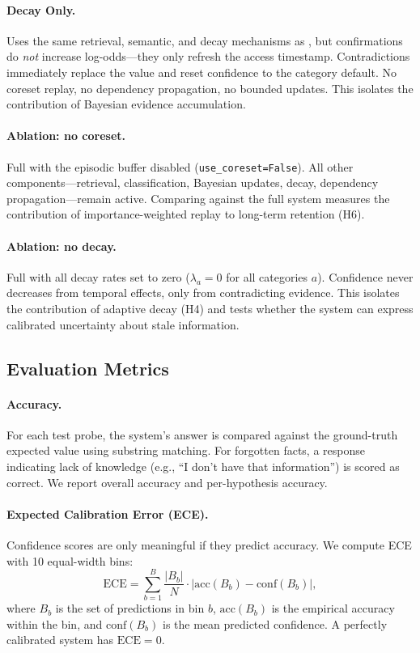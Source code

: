 \paragraph{Decay Only.}
Uses the same retrieval, semantic, and decay mechanisms as \membayes{}, but confirmations do \emph{not} increase log-odds---they only refresh the access timestamp. Contradictions immediately replace the value and reset confidence to the category default. No coreset replay, no dependency propagation, no bounded updates. This isolates the contribution of Bayesian evidence accumulation.

\paragraph{Ablation: no coreset.}
Full \membayes{} with the episodic buffer disabled (\texttt{use\_coreset=False}). All other components---retrieval, classification, Bayesian updates, decay, dependency propagation---remain active. Comparing against the full system measures the contribution of importance-weighted replay to long-term retention (H6).

\paragraph{Ablation: no decay.}
Full \membayes{} with all decay rates set to zero ($\lambda_a = 0$ for all categories $a$). Confidence never decreases from temporal effects, only from contradicting evidence. This isolates the contribution of adaptive decay (H4) and tests whether the system can express calibrated uncertainty about stale information.


\subsection{Evaluation Metrics}
\label{sec:metrics}

\paragraph{Accuracy.}
For each test probe, the system's answer is compared against the ground-truth expected value using substring matching. For forgotten facts, a response indicating lack of knowledge (e.g., ``I don't have that information'') is scored as correct. We report overall accuracy and per-hypothesis accuracy.

\paragraph{Expected Calibration Error (ECE).}
Confidence scores are only meaningful if they predict accuracy. We compute ECE with 10 equal-width bins:
\begin{equation}
  \mathrm{ECE} = \sum_{b=1}^{B} \frac{|B_b|}{N} \cdot \big|\mathrm{acc}(B_b) - \mathrm{conf}(B_b)\big|,
  \label{eq:ece}
\end{equation}
where $B_b$ is the set of predictions in bin $b$, $\mathrm{acc}(B_b)$ is the empirical accuracy within the bin, and $\mathrm{conf}(B_b)$ is the mean predicted confidence. A perfectly calibrated system has $\mathrm{ECE} = 0$.

